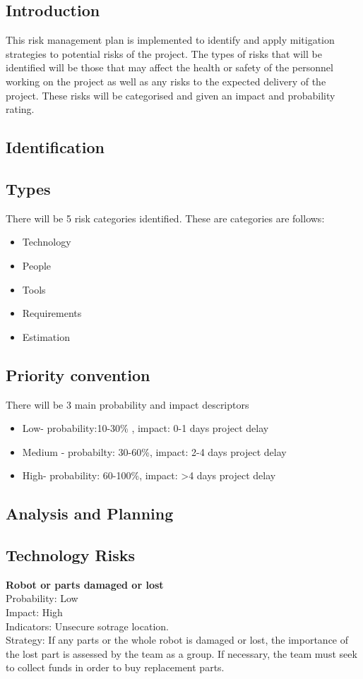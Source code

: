 \documentclass[11pt, a4paper]{article}
\begin{document}
		\subsection{Introduction}
		This risk management plan is implemented to identify and apply mitigation strategies to potential risks of the project. 
		The types of risks that will be identified will be those that may affect the health or safety of the personnel working on the project as well as 
		any risks to the expected delivery of the project. These risks will be categorised and given an impact and probability rating.
		\subsection{Identification}
			\subsection*{Types}
			There will be 5 risk categories identified. These are categories are follows: 
			\begin{itemize}
			\item Technology
			\item People
			\item Tools
			\item Requirements
			\item Estimation
			\end{itemize}	
			\subsection*{Priority convention}	
			There will be 3 main probability and impact  descriptors
			\begin{itemize}
			\item Low- probability:10-30\% , impact: 0-1 days project delay
			\item Medium - probabilty: 30-60\%, impact: 2-4 days project delay
			\item High- probability: 60-100\%, impact: >4 days project delay 
			\end{itemize}			
			
		\subsection{Analysis  and Planning}
			\subsection*{Technology Risks}
			\textbf{Robot or parts damaged or lost}\\
			Probability: Low\\
			Impact: High\\
			Indicators: Unsecure sotrage location.\\
			Strategy: If any parts or the whole robot is damaged or lost, the importance of the lost part is assessed by the team as a group. If necessary, the team must seek to collect funds in order to buy replacement parts.	\\
	
\end{document}
